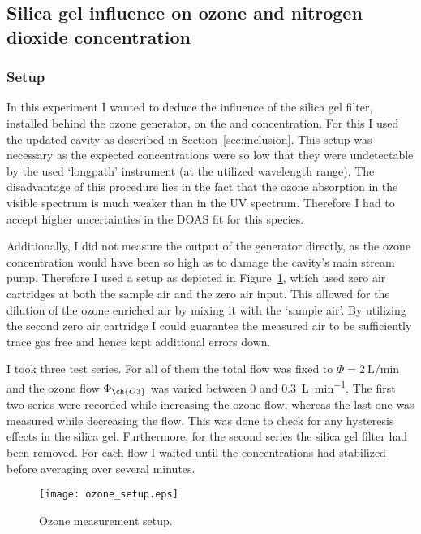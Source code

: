 \subsection{Silica gel influence on ozone and nitrogen dioxide concentration}
\label{sec:silica}

\subsubsection{Setup}
\label{sec:silica-setup}

In this experiment I wanted to deduce the influence of the silica gel
filter, installed behind the ozone generator, on the  and
 concentration. For this I used the updated cavity as described
in Section~\ref{sec:inclusion}. This setup was necessary as the
expected  concentrations were so low that they were
undetectable by the used `longpath' instrument (at the utilized
wavelength range). The disadvantage of this procedure lies in the
fact that the ozone absorption in the visible spectrum is much weaker
than in the UV spectrum. Therefore I had to accept higher
uncertainties in the DOAS fit for this species.

Additionally, I did not measure the output of the generator directly,
as the ozone concentration would have been so high as to damage the
cavity's main stream pump. Therefore I used a setup as depicted in
Figure~\ref{fig:ozone-flow-setup}, which used zero air cartridges at
both the sample air and the zero air input. This allowed for the
dilution of the ozone enriched air by mixing it with the `sample
air'. By utilizing the second zero air cartridge I could guarantee the
measured air to be sufficiently trace gas free and hence kept
additional errors down.

I took three test series. For all of them the total flow was fixed to
$\Phi = \SI{2}{\liter\per\minute}$ and the ozone flow $\Phi_{\ch{O3}}$
was varied between \num{0} and \SI{0.3}{\liter\per\minute}. The first
two series were recorded while increasing the ozone flow, whereas the
last one was measured while decreasing the flow. This was done to
check for any hysteresis effects in the silica gel. Furthermore, for
the second series the silica gel filter had been removed. For each
flow I waited until the concentrations had stabilized before averaging
over several minutes.

\begin{figure}[htbp]
  \centering
  \texttt{[image: ozone\_setup.eps]}
  \caption{Ozone measurement setup.}
  \label{fig:ozone-flow-setup}
\end{figure}

